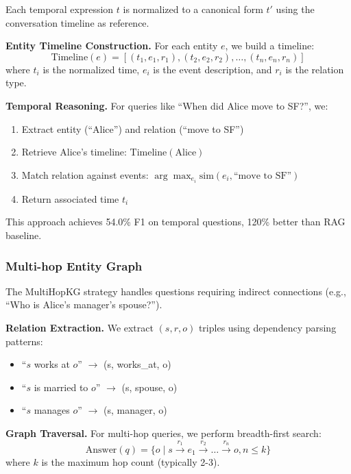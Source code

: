 Each temporal expression $t$ is normalized to a canonical form $t'$ using the conversation timeline as reference.

\textbf{Entity Timeline Construction.} For each entity $e$, we build a timeline:
\begin{equation}
\text{Timeline}(e) = [(t_1, e_1, r_1), (t_2, e_2, r_2), \ldots, (t_n, e_n, r_n)]
\end{equation}
where $t_i$ is the normalized time, $e_i$ is the event description, and $r_i$ is the relation type.

\textbf{Temporal Reasoning.} For queries like ``When did Alice move to SF?'', we:
\begin{enumerate}
    \item Extract entity (``Alice'') and relation (``move to SF'')
    \item Retrieve Alice's timeline: $\text{Timeline}(\text{Alice})$
    \item Match relation against events: $\arg\max_{e_i} \text{sim}(e_i, \text{``move to SF''})$
    \item Return associated time $t_i$
\end{enumerate}

This approach achieves 54.0\% F1 on temporal questions, 120\% better than RAG baseline.

\subsubsection{Multi-hop Entity Graph}

The MultiHopKG strategy handles questions requiring indirect connections (e.g., ``Who is Alice's manager's spouse?'').

\textbf{Relation Extraction.} We extract $(s, r, o)$ triples using dependency parsing patterns:
\begin{itemize}
    \item ``$s$ works at $o$'' $\rightarrow$ (s, works\_at, o)
    \item ``$s$ is married to $o$'' $\rightarrow$ (s, spouse, o)
    \item ``$s$ manages $o$'' $\rightarrow$ (s, manager, o)
\end{itemize}

\textbf{Graph Traversal.} For multi-hop queries, we perform breadth-first search:
\begin{equation}
\text{Answer}(q) = \{o \mid s \xrightarrow{r_1} e_1 \xrightarrow{r_2} \ldots \xrightarrow{r_n} o, n \leq k\}
\end{equation}
where $k$ is the maximum hop count (typically 2-3).

